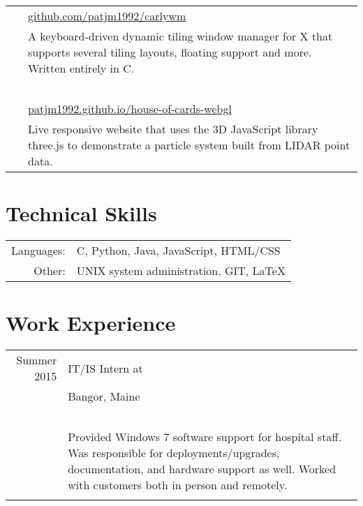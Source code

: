 \documentclass[a4paper,10pt]{article}
\begin{document}
\begin{tabular}{r p{11cm}}
 {\setmainfont{HoeflerText Italic.otf}}&\href{https://github.com/patjm1992/carlywm}{github.com/patjm1992/carlywm}\\ & A keyboard-driven dynamic tiling window manager for X that supports several tiling layouts, floating support and more. Written entirely in C.\\~\\
 
 
 
 {\setmainfont{HoeflerText Italic.otf}}\hspace*{1.55cm}& \href{https://patjm1992.github.io/house-of-cards-webgl}{patjm1992.github.io/house-of-cards-webgl}\\ &  Live responsive website that uses the 3D JavaScript library three.js to demonstrate a particle system built from LIDAR point data.  \\

\end{tabular}

\vspace*{0.5cm}

\section{Technical Skills}
\begin{tabular}{rl}
 \footnotesize{Languages:}& \hspace*{0.2cm}  C, Python, Java, JavaScript, HTML/CSS\\
 \footnotesize{Other:}& \hspace*{0.2cm} UNIX system administration, GIT, \LaTeX\\

\end{tabular}

\vspace*{0.5cm}

 \section{Work Experience}
 \begin{tabular}{r p{11cm}}\footnotesize{Summer 2015} &IT/IS Intern at {\setmainfont{smallcaps.otf}{Eastern Maine Medical Center} \\&{\setmainfont{HoeflerText Italic.otf}Bangor, Maine}\\~\\&{Provided Windows 7 software support for hospital staff. Was responsible for deployments/upgrades, documentation, and hardware support as well. Worked with customers both in person and remotely.}\\\multicolumn{2}{c}{} \\
\end{tabular}
\end{document}
